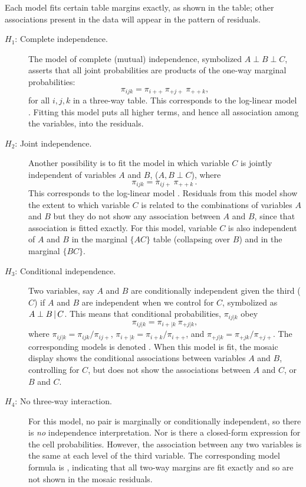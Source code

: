 Each model fits certain table margins exactly, as shown in the table;
other associations present in the data will appear in the pattern of
residuals.
\begin{description}
\item[$H_1$: Complete independence.]  The model of complete (mutual) independence, symbolized $A \perp B \perp C$,
       asserts that all joint probabilities are products of the
       one-way marginal probabilities:
\begin{equation*}
 \pi_{ijk} = \pi_{i++} \: \pi_{+j+} \: \pi_{++k}
 \comma
\end{equation*}
for all \(i , j , k\) in a
       three-way table.  This corresponds to the log-linear model
       .  Fitting this model puts all higher
       terms, and hence all association among the variables, into the
       residuals.
\item[$H_2$: Joint independence.]  Another possibility is to fit the model in
       which variable \(C\) is jointly independent of variables \(A\)
       and \(B\), ($A , B \perp C $), where
\begin{equation*}
 \pi_{ijk}  =  \pi_{ij+} \:  \pi_{++k} \period
\end{equation*}
This corresponds to the log-linear model .
Residuals from this model show the extent to which
variable \(C\) is related to the combinations of variables
\(A\) and \(B\) but they do not show any association between
\(A\) and \(B\), since that association is fitted exactly.
For this model, variable $C$ is also independent of $A$ and
$B$ in the marginal $\{AC\}$ table (collapsing over $B$) and
in the marginal $\{BC\}$.

\item[$H_3$: Conditional independence.] Two variables, say $A$ and $B$ are conditionally independent
given the third ($C$) if $A$ and $B$ are independent when we
control for $C$, symbolized as $A \perp B \, | \, C$.
This means that conditional probabilities, $\pi_{ij|k}$ obey
\begin{equation*}
 \pi_{ij|k}  =  \pi_{i+|k} \:  \pi_{+j|k} \comma
\end{equation*}
where
$\pi_{ij|k} = \pi_{ijk} / \pi_{ij+}$,
$\pi_{i+|k} = \pi_{i+k} / \pi_{i++}$, and
$\pi_{+j|k} = \pi_{+jk} / \pi_{+j+}$.
The corresponding \loglin{} models is denoted .
When this model is fit, the mosaic display shows the conditional
associations between variables $A$ and $B$, controlling for $C$,
but does not show the associations between $A$ and $C$, or
$B$ and $C$.

\item[$H_4$: No three-way interaction.]  For this model, no pair is
marginally or
conditionally independent, so there is \emph{no} independence interpretation.
Nor is there a closed-form expression for the cell probabilities.
However, the association between any two
variables is the same at each level of the third variable.
The corresponding \loglin{} model formula is ,
indicating that all two-way margins are fit exactly and so are not
shown in the mosaic residuals.
\end{description}




